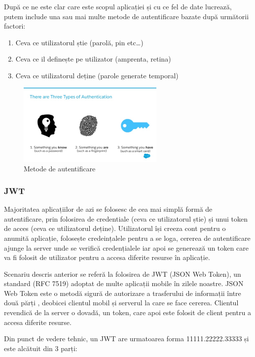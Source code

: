 \documentclass[12pt]{article}
\begin{document}
După ce ne este clar care este scopul aplicației și cu ce fel de date lucrează, 
putem include una sau mai multe metode de autentificare bazate după următorii
factori:

\begin{enumerate}
    \item Ceva ce utilizatorul știe (parolă, pin etc\dots)
    \item Ceva ce il definește pe utilizator (amprenta, retina)
    \item Ceva ce utilizatorul deține (parole generate temporal)
\end{enumerate}

\begin{figure}[H]
\centering
\includegraphics[height=4cm]{3ways.jpg}
\caption{Metode de autentificare \cite{3ways-auth}}
\end{figure}

\subsubsection{JWT}

Majoritatea aplicațiilor de azi se folosesc de cea mai simplă formă de autentificare,
prin folosirea de credentiale (ceva ce utilizatorul știe) și unui token de acces (ceva
ce utilizatorul deține). Utilizatorul își creeza cont pentru o anumită aplicație, folosește
credeințalele pentru a se loga, cererea de autentificare ajunge la server unde se verifică
credențialele iar apoi se generează un token care va fi folosit de utilizator pentru a accesa
diferite resurse în aplicație.

Scenariu descris anterior se referă la folosirea de JWT (JSON Web Token), un standard (RFC 7519) \cite{rfc-7519} 
adoptat de multe aplicații mobile în zilele noastre. 
JSON Web Token este o metodă sigură de autorizare a trasferului
de informații între două părți \cite{jwt}, deobicei 
clientul mobil și serverul la care se face cererea. Clientul revendică de la server
o dovadă, un token, care apoi este folosit de client pentru a accesa diferite 
resurse.

Din punct de vedere tehnic, un JWT are urmatoarea forma 11111.22222.33333 și este
alcătuit din 3 parți:
\end{document}
